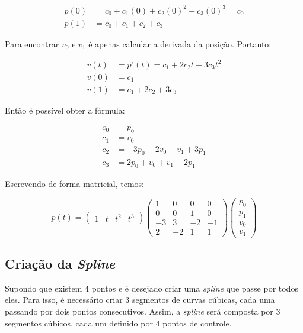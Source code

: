 \begin{align}
    p(0) &= c_0 + c_1(0) + c_2(0)^2 + c_3(0)^3 = c_0 \\
    p(1) &= c_0 + c_1 + c_2 + c_3
\end{align}


Para encontrar $v_0$ e $v_1$ é apenas calcular a derivada da posição. Portanto:

\begin{align}
    v(t) &= p'(t) = c_1 + 2c_2t + 3c_3t^2\\
    v(0) &= c_1\\
    v(1) &= c_1 + 2c_2 + 3c_3
\end{align}

Então é possível obter a fórmula:

\begin{align}
    c_0 &= p_0\\
    c_1 &= v_0\\
    c_2 &= -3p_0 - 2v_0 - v_1 + 3p_1\\
    c_3 &= 2p_0 + v_0 + v_1 - 2p_1
\end{align}

Escrevendo de forma matricial, temos:

\begin{equation}
    p(t) =  
        \left(
        \begin{array}{rrrr}
            1 & t & t^2 & t^3
        \end{array}\right)
        \left(
        \begin{array}{rrrr}
            1 & 0 & 0 & 0 \\
            0 & 0 & 1 & 0 \\
            -3 & 3 & -2 & -1 \\
                2 & -2 & 1 & 1
        \end{array}\right)
    \left(
        \begin{array}{r}
            p_0 \\
            p_1 \\
            v_0 \\
                v_1
        \end{array}\right)
 \end{equation}

 \subsection{Criação da \textit{Spline}}

 Supondo que existem 4 pontos e é desejado criar uma \textit{spline} que passe por todos eles. Para isso, é necessário criar 3 segmentos de curvas cúbicas, cada uma passando por dois pontos consecutivos. Assim, a \textit{spline} será composta por 3 segmentos cúbicos, cada um definido por 4 pontos de controle. \cite{CatmullRom}

